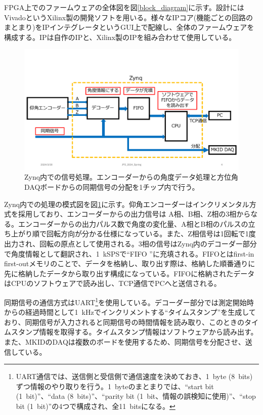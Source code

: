 FPGA上でのファームウェアの全体図を図\ref{block_diagram}に示す。設計にはVivadoというXilinx製の開発ソフトを用いる。様々なIPコア(機能ごとの回路のまとまり)をIPインテグレータというGUI上で配線し、全体のファームウェアを構成する。IPは自作のIPと、Xilinx製のIPを組み合わせて使用している。

\begin{figure}[htbp]
  \centering
  \includegraphics[width=1.0\columnwidth]{4_elDAQ/figs/zynq_flow.pdf}
  \caption{Zynq内での信号処理。エンコーダーからの角度データ処理と方位角DAQボードからの同期信号の分配を1チップ内で行う。}
  \label{zynq_flow}
\end{figure}

Zynq内での処理の模式図を図\ref{zynq_flow}に示す。仰角エンコーダーはインクリメンタル方式を採用しており、エンコーダーからの出力信号は A相、B相、Z相の3相からなる。エンコーダーからの出力パルス数で角度の変化量、A相とB相のパルスの立ち上がり順で回転方向が分かる仕様になっている。また、Z相信号は1回転で1度出力され、回転の原点として使用される。3相の信号はZynq内のデコーダー部分で角度情報として翻訳され、\SI{1}{kSPS}で``FIFO \cite{FIFO}''に充填される。FIFOとはfirst-in first-outメモリのことで、データを格納し、取り出す際は、格納した順番通りに先に格納したデータから取り出す構成になっている。FIFOに格納されたデータはCPUのソフトウェアで読み出し、TCP通信でPCへと送信される。

同期信号の通信方式はUART\footnote{UART通信では、送信側と受信側で通信速度を決めておき、\SI{1}{byte} (\SI{8}{bits})ずつ情報のやり取りを行う。\SI{1}{byte}のまとまりでは、``start bit (\SI{1}{bit})''、``data (\SI{8}{bits})''、``parity bit (\SI{1}{bit}、情報の誤検知に使用)''、``stop bit (\SI{1}{bit})''の4つで構成され、全\SI{11}{bits}になる。}を使用している。デコーダー部分では測定開始時からの経過時間として\SI{1}{kHz}でインクリメントする``タイムスタンプ''を生成しており、同期信号が入力されると同期信号の時間情報を読み取り、このときのタイムスタンプ情報を取得する。タイムスタンプ情報はソフトウェアから読み出す。また、MKIDのDAQは複数のボードを使用するため、同期信号を分配させ、送信している。


